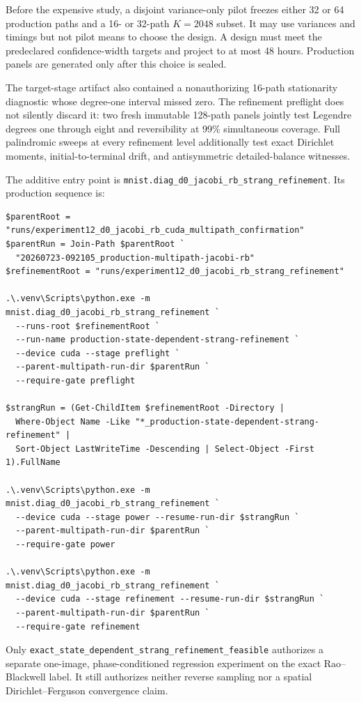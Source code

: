 \documentclass[11pt]{article}
\numberwithin{equation}{section}
\newcommand{\1}{\mathbf 1}
\begin{document}
Before the expensive study, a disjoint variance-only pilot freezes either
32 or 64 production paths and a 16- or 32-path $K=2048$ subset.  It may use
variances and timings but not pilot means to choose the design.  A design
must meet the predeclared confidence-width targets and project to at most
48 hours.  Production panels are generated only after this choice is
sealed.

The target-stage artifact also contained a nonauthorizing 16-path
stationarity diagnostic whose degree-one interval missed zero.  The
refinement preflight does not silently discard it: two fresh immutable
128-path panels jointly test Legendre degrees one through eight and
reversibility at 99\% simultaneous coverage.  Full palindromic sweeps at
every refinement level additionally test exact Dirichlet moments,
initial-to-terminal drift, and antisymmetric detailed-balance witnesses.

The additive entry point is
\nolinkurl{mnist.diag_d0_jacobi_rb_strang_refinement}.  Its production
sequence is:
\begin{Verbatim}[fontsize=\scriptsize,breaklines=true,breakanywhere=true]
$parentRoot = "runs/experiment12_d0_jacobi_rb_cuda_multipath_confirmation"
$parentRun = Join-Path $parentRoot `
  "20260723-092105_production-multipath-jacobi-rb"
$refinementRoot = "runs/experiment12_d0_jacobi_rb_strang_refinement"

.\.venv\Scripts\python.exe -m mnist.diag_d0_jacobi_rb_strang_refinement `
  --runs-root $refinementRoot `
  --run-name production-state-dependent-strang-refinement `
  --device cuda --stage preflight `
  --parent-multipath-run-dir $parentRun `
  --require-gate preflight

$strangRun = (Get-ChildItem $refinementRoot -Directory |
  Where-Object Name -Like "*_production-state-dependent-strang-refinement" |
  Sort-Object LastWriteTime -Descending | Select-Object -First 1).FullName

.\.venv\Scripts\python.exe -m mnist.diag_d0_jacobi_rb_strang_refinement `
  --device cuda --stage power --resume-run-dir $strangRun `
  --parent-multipath-run-dir $parentRun `
  --require-gate power

.\.venv\Scripts\python.exe -m mnist.diag_d0_jacobi_rb_strang_refinement `
  --device cuda --stage refinement --resume-run-dir $strangRun `
  --parent-multipath-run-dir $parentRun `
  --require-gate refinement
\end{Verbatim}

Only
\nolinkurl{exact_state_dependent_strang_refinement_feasible}
authorizes a separate one-image, phase-conditioned regression experiment on
the exact Rao--Blackwell label.  It still authorizes neither reverse
sampling nor a spatial Dirichlet--Ferguson convergence claim.
\end{document}

